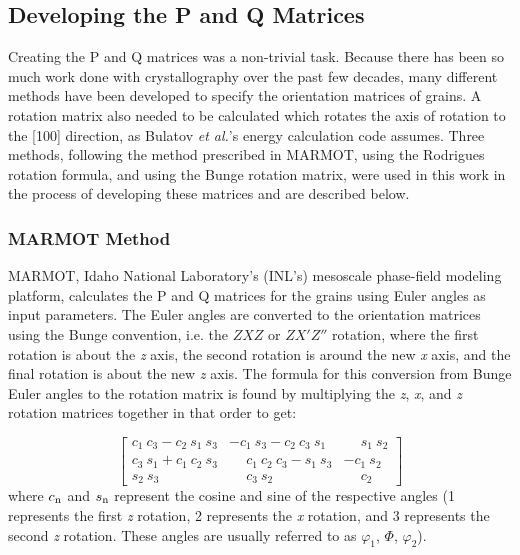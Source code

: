 \documentclass[12pt]{report}
\begin{document}
\subsection{Developing the P and Q Matrices\label{chi2:PQ}}
Creating the P and Q matrices was a non-trivial task.  Because there has been so much work done with crystallography over the past few decades, many different methods have been developed to specify the orientation matrices of grains. A rotation matrix also needed to be calculated which rotates the axis of rotation to the [100] direction, as Bulatov \emph{et al.}'s energy calculation code assumes.  Three methods, following the method prescribed in MARMOT, using the Rodrigues rotation formula, and using the Bunge rotation matrix, were used in this work in the process of developing these matrices and are described below.

\subsubsection{MARMOT Method\label{PQ:MARMOT}}
MARMOT, Idaho National Laboratory's (INL's) mesoscale phase-field modeling platform,\cite{tonks2012} calculates the P and Q matrices for the grains using Euler angles as input parameters.  The Euler angles are converted to the orientation matrices using the Bunge convention, i.e. the $ZXZ$ or $ZX'Z''$ rotation, where the first rotation is about the \emph{z} axis, the second rotation is around the new \emph{x} axis, and the final rotation is about the new \emph{z} axis.  The formula for this conversion from Bunge Euler angles to the rotation matrix is found by multiplying the \emph{z}, \emph{x}, and \emph{z} rotation matrices together in that order to get:

\begin{equation}
\label{eq:bungeMat}
\left[
\begin{array}{ccc}
c_1\ c_3 - c_2\ s_1\ s_3 & -c_1\ s_3 - c_2\ c_3\ s_1 & \phantom{-}s_1\ s_2 \\
c_3\ s_1 + c_1\ c_2\ s_3 & \phantom{-}c_1\ c_2\ c_3 - s_1\ s_3 & -c_1\ s_2 \\
s_2\ s_3 & \phantom{-}c_3\ s_2 & \phantom{-}c_2 
\end{array}
\right]
\end{equation}
where $c_\textnormal{n}$ and $s_\textnormal{n}$ represent the cosine and sine of the respective angles (1 represents the first \emph{z} rotation, 2 represents the \emph{x} rotation, and 3 represents the second \emph{z} rotation.  These angles are usually referred to as\cite{randle2000} $\varphi_1$, $\Phi$, $\varphi_2$).
\end{document}
